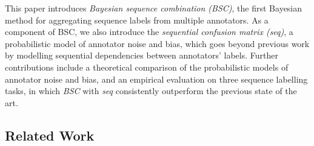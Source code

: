 %

This paper introduces \emph{Bayesian sequence combination (BSC)}, 
the first Bayesian method for aggregating sequence labels from multiple annotators.
As a component of BSC, we also introduce the \emph{sequential confusion matrix (seq)},
a probabilistic model of annotator noise and bias, 
which goes beyond previous work by modelling sequential dependencies between annotators' labels.
Further contributions include a theoretical comparison of the probabilistic models of annotator noise and bias,
and an empirical evaluation on three sequence labelling tasks,
in which \emph{BSC} with \emph{seq} consistently outperform the previous state of the art. 

\subsection{Related Work}

